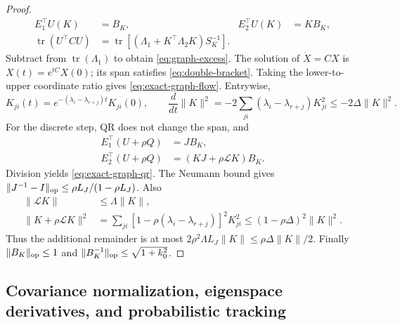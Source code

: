 \begin{proof}
\begin{align}
 E_1^\top U(K)&=B_K,&E_2^\top U(K)&=KB_K,\\
 \operatorname{tr}(U^\top CU)
 &=\operatorname{tr}[(\Lambda_1+K^\top\Lambda_2K)S_K^{-1}].
\end{align}
Subtract from $\operatorname{tr}(\Lambda_1)$ to obtain
\eqref{eq:graph-excess}. The solution of $\dot X=CX$ is
$X(t)=e^{tC}X(0)$; its span satisfies \eqref{eq:double-bracket}.
Taking the lower-to-upper coordinate ratio gives
\eqref{eq:exact-graph-flow}. Entrywise,
\begin{equation}
 K_{ji}(t)=e^{-(\lambda_i-\lambda_{r+j})t}K_{ji}(0),\qquad
 \frac{d}{dt}\|K\|^2
 =-2\sum_{ji}(\lambda_i-\lambda_{r+j})K_{ji}^2
 \le-2\Delta\|K\|^2.
\end{equation}
For the discrete step, QR does not change the span, and
\begin{align}
 E_1^\top(U+\rho Q)&=JB_K,\\
 E_2^\top(U+\rho Q)&=(KJ+\rho\mathcal LK)B_K.
\end{align}
Division yields \eqref{eq:exact-graph-qr}. The Neumann bound gives
$\|J^{-1}-I\|_{\rm op}\le\rho L_J/(1-\rho L_J)$.
Also
\begin{align}
 \|\mathcal LK\|&\le\Lambda\|K\|,\\
 \|K+\rho\mathcal LK\|^2
 &=\sum_{ji}[1-\rho(\lambda_i-\lambda_{r+j})]^2K_{ji}^2
 \le(1-\rho\Delta)^2\|K\|^2.
\end{align}
Thus the additional remainder is at most
$2\rho^2\Lambda L_J\|K\|\le\rho\Delta\|K\|/2$.
Finally $\|B_K\|_{\rm op}\le1$ and
$\|B_K^{-1}\|_{\rm op}\le\sqrt{1+k_0^2}$.
\end{proof}

\subsection{Covariance normalization, eigenspace derivatives, and probabilistic tracking}
\label{app:formal-tracking}

